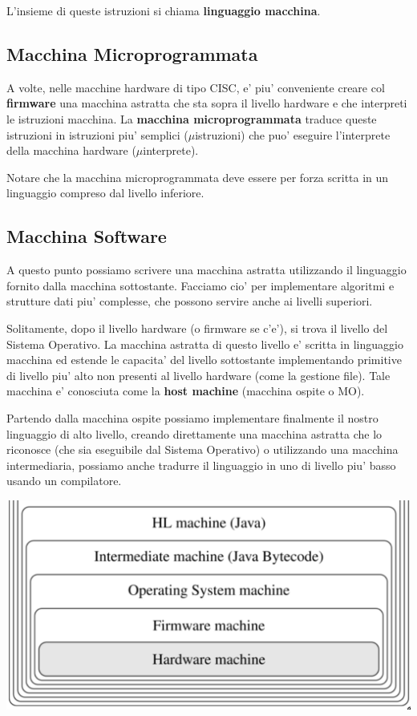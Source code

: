 L'insieme di queste istruzioni si chiama \textbf{linguaggio macchina}.

\subsection{Macchina Microprogrammata}
A volte, nelle macchine hardware di tipo CISC, e' piu' conveniente creare col \textbf{firmware} una macchina astratta che sta sopra il livello hardware e che interpreti le istruzioni macchina. La \textbf{macchina microprogrammata} traduce queste istruzioni in istruzioni piu' semplici ($ \mu $istruzioni) che puo' eseguire l'interprete della macchina hardware ($ \mu $interprete).

Notare che la macchina microprogrammata deve essere per forza scritta in un linguaggio compreso dal livello inferiore.

\subsection{Macchina Software}
A questo punto possiamo scrivere una macchina astratta utilizzando il linguaggio fornito dalla macchina sottostante. Facciamo cio' per implementare algoritmi e strutture dati piu' complesse, che possono servire anche ai livelli superiori.

Solitamente, dopo il livello hardware (o firmware se c'e'), si trova il livello del Sistema Operativo. La macchina astratta di questo livello e' scritta in linguaggio macchina ed estende le capacita' del livello sottostante implementando primitive di livello piu' alto non presenti al livello hardware (come la gestione file). Tale macchina e' conosciuta come la \textbf{host machine} (macchina ospite o MO).

Partendo dalla macchina ospite possiamo implementare finalmente il nostro linguaggio di alto livello, creando direttamente una macchina astratta che lo riconosce (che sia eseguibile dal Sistema Operativo) o utilizzando una macchina intermediaria, possiamo anche tradurre il linguaggio in uno di livello piu' basso usando un compilatore.

\begin{center}
  \includegraphics[scale=0.3]{img/2024-12-11-20-16-47.png}
\end{center}

